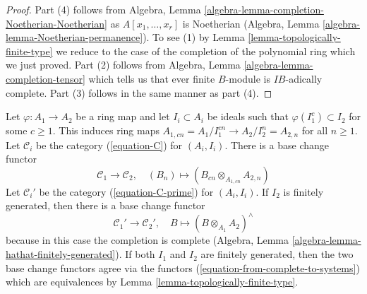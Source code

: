 \begin{proof}
Part (4) follows from
Algebra, Lemma \ref{algebra-lemma-completion-Noetherian-Noetherian}
as $A[x_1, \ldots, x_r]$ is Noetherian
(Algebra, Lemma \ref{algebra-lemma-Noetherian-permanence}).
To see (1) by Lemma \ref{lemma-topologically-finite-type}
we reduce to the case of the completion of the polynomial ring
which we just proved.
Part (2) follows from Algebra, Lemma \ref{algebra-lemma-completion-tensor}
which tells us that ever finite $B$-module is $IB$-adically complete.
Part (3) follows in the same manner as part (4).
\end{proof}

\begin{remark}
\label{remark-base-change}
Let $\varphi : A_1 \to A_2$ be a ring map and let
$I_i \subset A_i$ be ideals such that $\varphi(I_1^c) \subset I_2$
for some $c \geq 1$. This induces ring maps
$A_{1, cn} = A_1/I_1^{cn} \to A_2/I_2^n = A_{2, n}$ for all $n \geq 1$.
Let $\mathcal{C}_i$ be the category (\ref{equation-C}) for $(A_i, I_i)$.
There is a base change functor
\begin{equation}
\label{equation-base-change-systems}
\mathcal{C}_1 \longrightarrow \mathcal{C}_2,\quad
(B_n) \longmapsto (B_{cn} \otimes_{A_{1, cn}} A_{2, n})
\end{equation}
Let $\mathcal{C}_i'$ be the category (\ref{equation-C-prime}) for $(A_i, I_i)$.
If $I_2$ is finitely generated, then there is a base change functor
\begin{equation}
\label{equation-base-change-complete}
\mathcal{C}_1' \longrightarrow \mathcal{C}_2',\quad
B \longmapsto (B \otimes_{A_1} A_2)^\wedge
\end{equation}
because in this case the completion is complete
(Algebra, Lemma \ref{algebra-lemma-hathat-finitely-generated}).
If both $I_1$ and $I_2$ are finitely generated, then
the two base change functors agree via the functors
(\ref{equation-from-complete-to-systems})
which are equivalences by Lemma \ref{lemma-topologically-finite-type}.
\end{remark}

